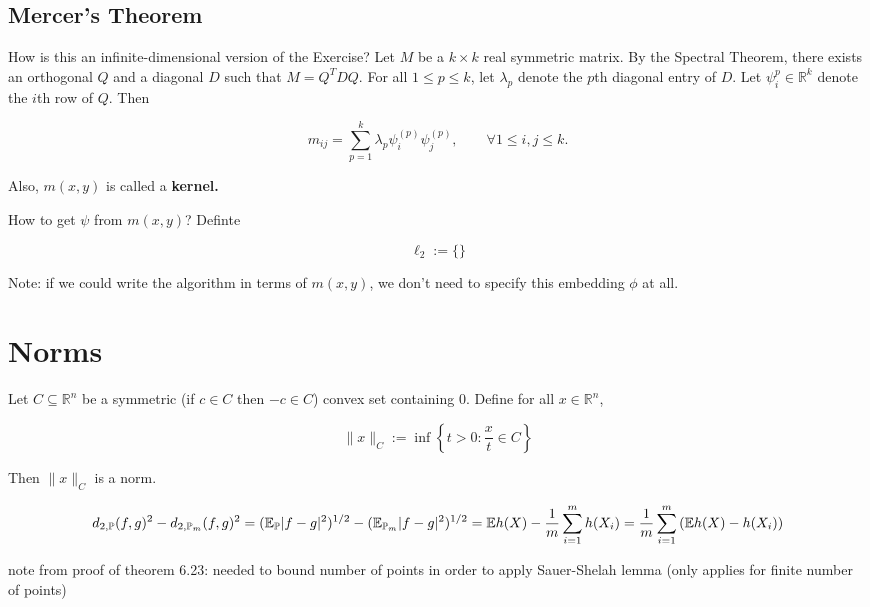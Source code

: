 \subsection{Mercer's Theorem}

How is this an infinite-dimensional version of the Exercise? Let \(M\) be a \(k \times k\) real symmetric matrix. By the Spectral Theorem, there exists an orthogonal \(Q\) and a diagonal \(D\) such that \(M = Q^T D Q\). For all \(1 \leq p \leq k\), let \(\lambda_p\) denote the \(p\)th diagonal entry of \(D\). Let \(\psi_i^{p} \in \mathbb{R}^k\) denote the \(i\)th row of \(Q\). Then

\[
m_{ij} = \sum_{p=1}^k \lambda_p \psi_i^{(p)} \psi_j^{(p)}, \qquad \forall 1 \leq i, j \leq k.
\]

Also, \(m(x,y)\) is called a \textbf{kernel.}

How to get \(\psi\) from \(m(x,y)\)? Definte 

\[
\ell_2 := \{ \} 
\]

Note: if we could write the algorithm in terms of \(m(x,y)\), we don't need to specify this embedding \(\phi\) at all. 

\section{Norms}

\begin{proposition}

Let \(C \subseteq \mathbb{R}^n\) be a symmetric (if \(c \in C\) then \(-c \in C\)) convex set containing 0. Define for all \(x \in \mathbb{R}^n\), 

\[
 \lVert x \rVert_C := \inf \left\{  t > 0: \frac{x}{t} \in C \right\}
\]

Then \( \lVert x \rVert_C\) is a norm.

\end{proposition}

\begin{theorem}

\[
d_{2, \mathbb{P}}(f,g)^2 - d_{2, \mathbb{P}_m}(f,g)^2 = ( \mathbb{E}_ \mathbb{P}|f - g|^2) ^{1/2} -  ( \mathbb{E}_ {\mathbb{P}_m}|f - g|^2) ^{1/2} = \mathbb{E} h(X) - \frac{1}{m} \sum_{i=1}^m h(X_i) = \frac{1}{m} \sum_{i=1}^m \left( \mathbb{E} h(X) - h(X_i) \right)
\]

\end{theorem}

note from proof of theorem 6.23: needed to bound number of points in order to apply Sauer-Shelah lemma (only applies for finite number of points)

